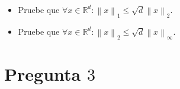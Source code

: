 \documentclass[aspectratio=1610,spanish,8pt]{beamer}
\begin{document}
\begin{frame}
    \frametitle{\secname}

    \begin{itemize}
        \item

              Pruebe que
              \begin{math}
                  \forall x\in\mathbb{R}^{d}:
                  \left\|x\right\|_{1}\leq
                  \sqrt{d}{\left\|x\right\|}_{2}
              \end{math}.

        \item

              Pruebe que
              \begin{math}
                  \forall x\in\mathbb{R}^{d}:
                  \left\|x\right\|_{2}\leq
                  \sqrt{d}{\left\|x\right\|}_{\infty}
              \end{math}.
    \end{itemize}
\end{frame}

\section{Pregunta $3$}
\end{document}
